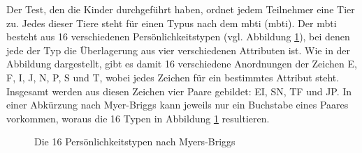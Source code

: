 Der Test, den die Kinder durchgeführt haben, ordnet jedem Teilnehmer eine Tier zu. Jedes dieser Tiere steht für einen Typus nach dem \acrlong{mbti} (\acrshort{mbti}). Der \acrshort{mbti} besteht aus 16 verschiedenen Persönlichkeitstypen (vgl. Abbildung \ref{img:mbti}), bei denen jede der Typ die Überlagerung aus vier verschiedenen Attributen ist. Wie in der Abbildung dargestellt, gibt es damit 16 verschiedene Anordnungen der Zeichen E, F, I, J, N, P, S und T, wobei jedes Zeichen für ein bestimmtes Attribut steht. Insgesamt werden aus diesen Zeichen vier Paare gebildet: EI, SN, TF und JP. In einer Abkürzung nach Myer-Briggs kann jeweils nur ein Buchstabe eines Paares vorkommen, woraus die 16 Typen in Abbildung \ref{img:mbti} resultieren.
\begin{figure}[htbp!]
	\centering
	\caption[Myers-Briggs-Typenindikator]{Die 16 Persönlichkeitstypen nach Myers-Briggs}
	\label{img:mbti}
\end{figure}

